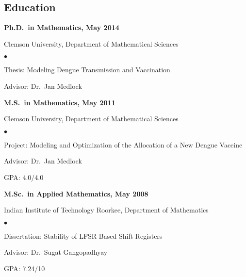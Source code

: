 \documentclass[margin,line,pifont,palatino,courier]{res}
\newenvironment{list1}{
  \begin{list}{\ding{113}}{%
      \setlength{\itemsep}{0in}
      \setlength{\parsep}{0in} \setlength{\parskip}{0in}
      \setlength{\topsep}{0in} \setlength{\partopsep}{0in}
      \setlength{\leftmargin}{0.17in}}}{\end{list}}
\newenvironment{list2}{
  \begin{list}{$\bullet$}{%
      \setlength{\itemsep}{0in}
      \setlength{\parsep}{0in} \setlength{\parskip}{0in}
      \setlength{\topsep}{0in} \setlength{\partopsep}{0in}
      \setlength{\leftmargin}{0.2in}}}{\end{list}}
\begin{document}
\begin{resume}
\section{\sc Education}

{\bf Ph.D.~in Mathematics, May 2014}\\
\vspace*{-.1in}
\begin{list1}
\item[] Clemson University, Department of Mathematical Sciences

\begin{list2}
\vspace*{.05in}
\item Thesis:  Modeling Dengue Transmission and Vaccination
\item Advisor: Dr.~Jan Medlock
\end{list2}
\end{list1}

{\bf M.S.~in Mathematics, May 2011}\\
\vspace*{-.1in}
\begin{list1}
\item[] Clemson University, Department of Mathematical Sciences
\begin{list2}
\vspace*{.05in}
\item Project:  Modeling and Optimization of the Allocation of a New Dengue Vaccine
\item Advisor: Dr.~Jan Medlock
\item GPA: 4.0/4.0
\end{list2}
\end{list1}

{\bf  M.Sc.~in Applied Mathematics, May 2008} \\
\vspace*{-.1in}
\begin{list1}
\item[] Indian Institute of Technology Roorkee, Department of Mathematics

\begin{list2}
\vspace*{.05in}
\item Dissertation:  Stability of LFSR Based Shift Registers
\item Advisor: Dr.~Sugat Gangopadhyay
\item GPA: 7.24/10
\end{list2}

\end{list1}


\end{resume}
\end{document}
